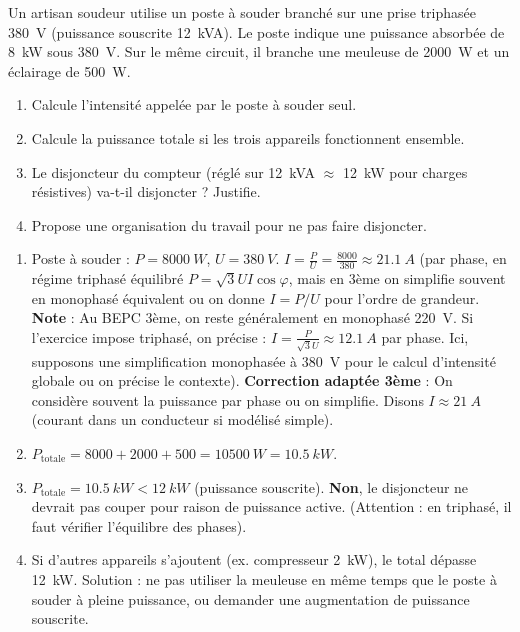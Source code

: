 \documentclass[11pt]{article}
\begin{document}
\begin{exercice}
Un artisan soudeur utilise un poste à souder branché sur une prise triphasée \SI{380}{V} (puissance souscrite \SI{12}{kVA}). Le poste indique une puissance absorbée de \SI{8}{kW} sous \SI{380}{V}. Sur le même circuit, il branche une meuleuse de \SI{2000}{W} et un éclairage de \SI{500}{W}.
\begin{enumerate}
\item Calcule l'intensité appelée par le poste à souder seul.
\item Calcule la puissance totale si les trois appareils fonctionnent ensemble.
\item Le disjoncteur du compteur (réglé sur \SI{12}{kVA} $\approx$ \SI{12}{kW} pour charges résistives) va-t-il disjoncter ? Justifie.
\item Propose une organisation du travail pour ne pas faire disjoncter.
\end{enumerate}
\end{exercice}

\begin{corrige}
\begin{enumerate}
\item Poste à souder : $P = \SI{8000}{W}$, $U = \SI{380}{V}$. $I = \frac{P}{U} = \frac{8000}{380} \approx \SI{21,1}{A}$ (par phase, en régime triphasé équilibré $P = \sqrt{3} U I \cos\varphi$, mais en 3ème on simplifie souvent en monophasé équivalent ou on donne $I = P/U$ pour l'ordre de grandeur. \textbf{Note} : Au BEPC 3ème, on reste généralement en monophasé \SI{220}{V}. Si l'exercice impose triphasé, on précise : $I = \frac{P}{\sqrt{3} U} \approx \SI{12,1}{A}$ par phase. Ici, supposons une simplification monophasée à \SI{380}{V} pour le calcul d'intensité globale ou on précise le contexte). \textbf{Correction adaptée 3ème} : On considère souvent la puissance par phase ou on simplifie. Disons $I \approx \SI{21}{A}$ (courant dans un conducteur si modélisé simple).
\item $P_{\text{totale}} = 8000 + 2000 + 500 = \SI{10500}{W} = \SI{10,5}{kW}$.
\item $P_{\text{totale}} = \SI{10,5}{kW} < \SI{12}{kW}$ (puissance souscrite). \textbf{Non}, le disjoncteur ne devrait pas couper pour raison de puissance active. (Attention : en triphasé, il faut vérifier l'équilibre des phases).
\item Si d'autres appareils s'ajoutent (ex. compresseur \SI{2}{kW}), le total dépasse \SI{12}{kW}. Solution : ne pas utiliser la meuleuse en même temps que le poste à souder à pleine puissance, ou demander une augmentation de puissance souscrite.
\end{enumerate}
\end{corrige}
\end{document}
